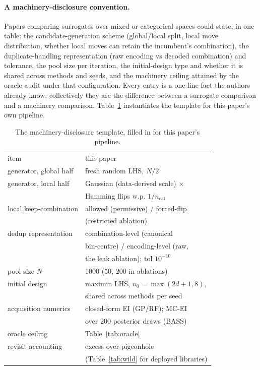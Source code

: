 \documentclass[%
 aip,
 amsmath,amssymb,
 floatfix,
 reprint,%
]{revtex4-1}
\begin{document}
\paragraph{A machinery-disclosure convention.}
Papers comparing surrogates over mixed or categorical spaces could state,
in one table: the candidate-generation scheme (global/local split, local
move distribution, whether local moves can retain the incumbent's
combination), the duplicate-handling representation (raw encoding vs
decoded combination) and tolerance, the pool size per iteration, the
initial-design type and whether it is shared across methods and seeds,
and the machinery ceiling attained by the oracle audit under that
configuration. Every entry is a one-line fact the authors already know;
collectively they are the difference between a surrogate comparison and
a machinery comparison. Table~\ref{tab:disclosure} instantiates the
template for this paper's own pipeline.

\begin{table}[t]
\caption{\label{tab:disclosure}The machinery-disclosure template,
filled in for this paper's pipeline.}
\begin{ruledtabular}
\begin{tabular}{ll}
item & this paper \\
\colrule
generator, global half & fresh random LHS, $N/2$ \\
generator, local half & Gaussian (data-derived scale) $\times$ \\
 & Hamming flips w.p. $1/n_{\mathrm{cat}}$ \\
local keep-combination & allowed (permissive) / forced-flip \\
 & (restricted ablation) \\
dedup representation & combination-level (canonical \\
 & bin-centre) / encoding-level (raw, \\
 & the leak ablation); tol $10^{-10}$ \\
pool size $N$ & 1000 (50, 200 in ablations) \\
initial design & maximin LHS, $n_0 = \max(2d{+}1, 8)$, \\
 & shared across methods per seed \\
acquisition numerics & closed-form EI (GP/RF); MC-EI \\
 & over 200 posterior draws (BASS) \\
oracle ceiling & Table~\ref{tab:oracle} \\
revisit accounting & excess over pigeonhole \\
 & (Table~\ref{tab:wild} for deployed libraries) \\
\end{tabular}
\end{ruledtabular}
\end{table}
\end{document}
